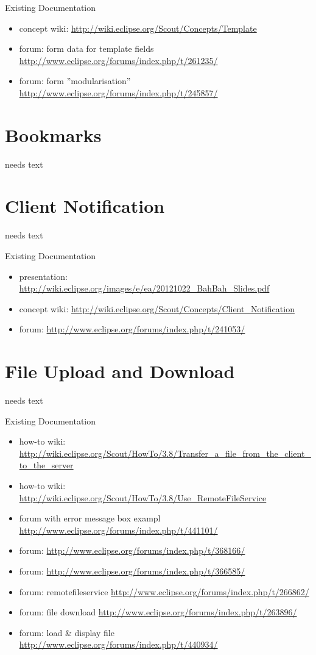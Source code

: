 \documentclass[a4paper,10pt,twoside]{book}
\begin{document}
\noindent Existing Documentation
\begin{itemize}
  \item concept wiki: \url{http://wiki.eclipse.org/Scout/Concepts/Template}
  \item forum: form data for template fields \url{http://www.eclipse.org/forums/index.php/t/261235/}
  \item forum: form ''modularisation'' \url{http://www.eclipse.org/forums/index.php/t/245857/}
\end{itemize}

\chapter{Bookmarks}
needs text

\chapter{Client Notification}
needs text

\noindent Existing Documentation
\begin{itemize}
  \item presentation: \url{http://wiki.eclipse.org/images/e/ea/20121022_BahBah_Slides.pdf}
  \item concept wiki: \url{http://wiki.eclipse.org/Scout/Concepts/Client_Notification}
  \item forum: \url{http://www.eclipse.org/forums/index.php/t/241053/}
\end{itemize}
      
\chapter{File Upload and Download}
needs text

\noindent Existing Documentation
\begin{itemize}
  \item how-to wiki: \url{http://wiki.eclipse.org/Scout/HowTo/3.8/Transfer_a_file_from_the_client_to_the_server}
  \item how-to wiki: \url{http://wiki.eclipse.org/Scout/HowTo/3.8/Use_RemoteFileService}
  \item forum with error message box exampl \url{http://www.eclipse.org/forums/index.php/t/441101/}
  \item forum: \url{http://www.eclipse.org/forums/index.php/t/368166/}
  \item forum: \url{http://www.eclipse.org/forums/index.php/t/366585/}
  \item forum: remotefileservice \url{http://www.eclipse.org/forums/index.php/t/266862/}
  \item forum: file download \url{http://www.eclipse.org/forums/index.php/t/263896/}
  \item forum: load \& display file \url{http://www.eclipse.org/forums/index.php/t/440934/}
\end{itemize}
\end{document}
